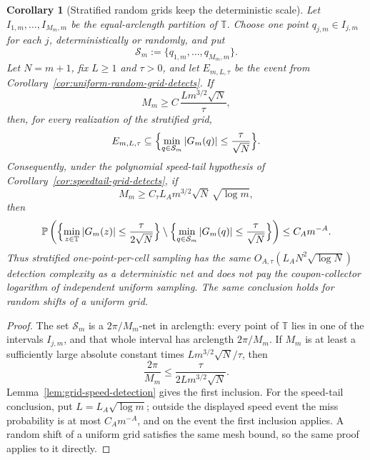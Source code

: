 \documentclass[11pt]{amsart}
\numberwithin{equation}{section}
\newtheorem{corollary}[theorem]{Corollary}
\theoremstyle{definition}
\theoremstyle{remark}
\newcommand{\T}{\mathbb T}
\newcommand{\Prob}{\mathbb P}
\newcommand{\abs}[1]{\left\lvert #1\right\rvert}
\begin{document}
\begin{corollary}[Stratified random grids keep the deterministic scale]
\label{cor:stratified-grid-detects}
Let \(I_{1,m},\ldots,I_{M_m,m}\) be the equal-arclength partition of \(\T\).
Choose one point \(q_{j,m}\in I_{j,m}\) for each \(j\), deterministically or
randomly, and put
\[
  \mathcal S_m:=\{q_{1,m},\ldots,q_{M_m,m}\}.
\]
Let \(N=m+1\), fix \(L\ge1\) and \(\tau>0\), and let \(E_{m,L,\tau}\) be the
event from Corollary~\ref{cor:uniform-random-grid-detects}.  If
\[
  M_m\ge C\,\frac{Lm^{3/2}\sqrt N}{\tau},
\]
then, for every realization of the stratified grid,
\[
  E_{m,L,\tau}
  \subseteq
  \Bigl\{\min_{q\in\mathcal S_m}\abs{G_m(q)}
      \le \frac{\tau}{\sqrt N}\Bigr\}.
\]
Consequently, under the polynomial speed-tail hypothesis of
Corollary~\ref{cor:speedtail-grid-detects}, if
\[
  M_m\ge C_\tau L_A m^{3/2}\sqrt N\,\sqrt{\log m},
\]
then
\[
  \Prob\left(
    \Bigl\{\min_{z\in\T}\abs{G_m(z)}\le \frac{\tau}{2\sqrt N}\Bigr\}
    \setminus
    \Bigl\{\min_{q\in \mathcal S_m}\abs{G_m(q)}
        \le \frac{\tau}{\sqrt N}\Bigr\}
  \right)
  \le C_A m^{-A}.
\]
Thus stratified one-point-per-cell sampling has the same
\(O_{A,\tau}(L_A N^2\sqrt{\log N})\) detection complexity as a deterministic
net and does not pay the coupon-collector logarithm of independent uniform
sampling.  The same conclusion holds for random shifts of a uniform grid.
\end{corollary}

\begin{proof}
The set \(\mathcal S_m\) is a \(2\pi/M_m\)-net in arclength: every point of
\(\T\) lies in one of the intervals \(I_{j,m}\), and that whole interval has
arclength \(2\pi/M_m\).  If \(M_m\) is at least a sufficiently large absolute
constant times \(Lm^{3/2}\sqrt N/\tau\), then
\[
  \frac{2\pi}{M_m}\le \frac{\tau}{2Lm^{3/2}\sqrt N}.
\]
Lemma~\ref{lem:grid-speed-detection} gives the first inclusion.  For the
speed-tail conclusion, put \(L=L_A\sqrt{\log m}\); outside the displayed speed
event the miss probability is at most \(C_A m^{-A}\), and on the event the
first inclusion applies.  A random shift of a uniform grid satisfies the same
mesh bound, so the same proof applies to it directly.
\end{proof}
\end{document}

